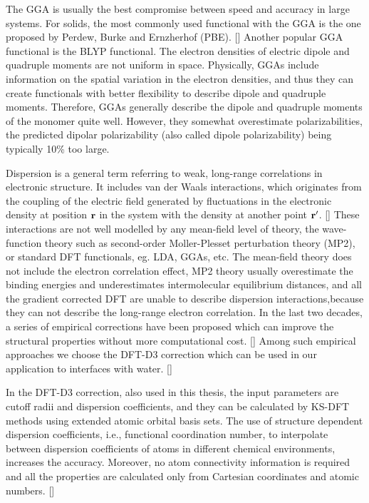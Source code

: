 The GGA is usually the best compromise between speed and accuracy in large systems. For solids, the most commonly used functional
with the GGA is the one proposed by Perdew, Burke and Ernzherhof (PBE). [\cite{PBE96}] 
Another popular GGA functional is the BLYP functional.  
The electron densities of electric dipole and quadruple moments are not uniform in space.
Physically, GGAs include information on the spatial variation in the electron densities,
and thus they can create functionals with better flexibility to describe dipole and quadruple moments. 
Therefore, GGAs generally describe the dipole and quadruple moments of the monomer quite well. 
However, they somewhat overestimate polarizabilities, the predicted dipolar 
polarizability (also called dipole polarizability) being typically 10\% too large.

Dispersion is a general term referring to weak, long-range correlations in electronic structure. It includes van der Waals interactions,
which originates from the coupling of the electric field generated by fluctuations in the electronic density at position $\bf{r}$ 
in the system with the density at another point $\bf{r'}$. [\cite{Kohanoff06}] These interactions are not well modelled by any mean-field level of theory, 
the \abinitio wave-function theory such as second-order M{o}ller-Plesset perturbation theory (MP2), 
or standard DFT functionals, eg. LDA, GGAs, etc. 
The mean-field theory does not include the electron correlation effect, MP2 theory usually overestimate the binding energies 
and underestimates intermolecular equilibrium distances, and all the gradient corrected DFT are unable to describe dispersion 
interactions,because they can not describe the long-range electron correlation.
In the last two decades, a series of empirical corrections have been proposed which can improve the structural properties 
without more computational cost. [\cite{WuX01,WuQ02,Zimmerli04,Grimme04,Grimme06,Grimme07,Grimme10}]
Among such empirical approaches we  choose the DFT-D3 correction which can be used in our application to interfaces with water. [\cite{Grimme10,Klimes2012}]

In the DFT-D3 correction, also used in this thesis, the input parameters are cutoff radii and dispersion coefficients, and they can be calculated by 
KS-DFT methods using extended atomic orbital basis sets. The use of structure dependent dispersion coefficients, 
i.e., functional coordination number, to interpolate between dispersion coefficients of atoms in different chemical environments, 
increases the accuracy.  Moreover, no atom connectivity information is required and all the properties are calculated only 
from Cartesian coordinates and atomic numbers. [\cite{Grimme10}]

